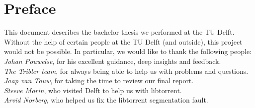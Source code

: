 \chapter*{Preface}
This document describes the bachelor thesis we performed at the TU Delft. Without the help of certain people at the TU Delft (and outside), this project would not be possible. In particular, we would like to thank the following people: \\

\emph{Johan Pouwelse}, for his excellent guidance, deep insights and feedback.\\

\emph{The Tribler team}, for always being able to help us with problems and questions.\\

\emph{Jaap van Touw}, for taking the time to review our final report.\\

\emph{Steeve Morin}, who visited Delft to help us with libtorrent.\\

\emph{Arvid Norberg}, who helped us fix the libtorrent segmentation fault.